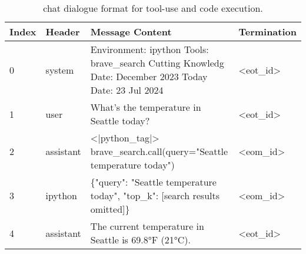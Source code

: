
\begin{table}[ht]
  \centering
  \begin{tabular}{ll>{\raggedright}p{8cm}l}
    \toprule
    Index & Header & Message Content & Termination \\
    \midrule
    0 & system & Environment: ipython \linebreak Tools: brave\_search \linebreak Cutting Knowledg Date: December 2023 \linebreak Today Date: 23 Jul 2024 & <eot\_id> \\
    \midrule
    1 & user & What's the temperature in Seattle today? & <eot\_id> \\
    \midrule
    2 & assistant &  <|python\_tag|> brave\_search.call(query="Seattle temperature today") & <eom\_id> \\
    \midrule
    3 & ipython & \{"query": "Seattle temperature today", "top\_k": [search results omitted]\} & <eom\_id> \\
    \midrule
    4 & assistant & The current temperature in Seattle is 69.8°F (21°C). & <eot\_id> \\
    \bottomrule
  \end{tabular}
  \caption{\llamathree chat dialogue format for tool-use and code execution.}
  \label{tab:chat_format}
\end{table}
